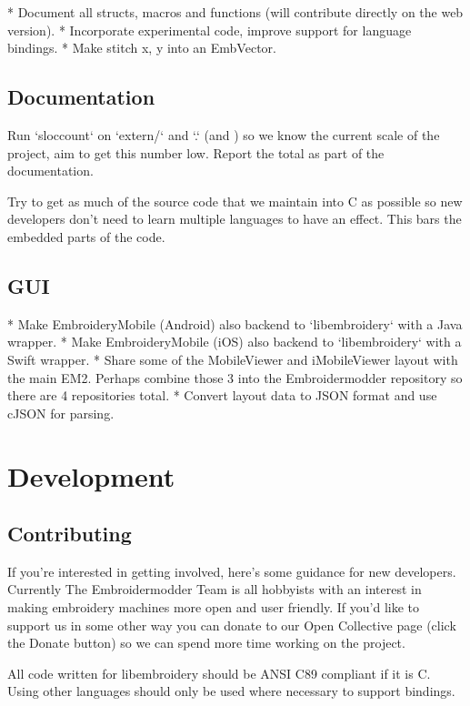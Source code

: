 \documentclass[a4paper]{report}
\begin{document}
* Document all structs, macros and functions (will contribute directly
  on the web version).
* Incorporate experimental code, improve support for language bindings.
* Make stitch x, y into an EmbVector.

\subsection{Documentation}

Run `sloccount` on `extern/` and `.` (and ) so we know the
current scale of the project, aim to get this number low. Report the total as
part of the documentation.

Try to get as much of the source code that we maintain into C as possible so
new developers don't need to learn multiple languages to have an effect. This
bars the embedded parts of the code.

\subsection{GUI}

* Make EmbroideryMobile (Android) also backend to `libembroidery` with a Java wrapper.
* Make EmbroideryMobile (iOS) also backend to `libembroidery` with a Swift wrapper.
* Share some of the MobileViewer and iMobileViewer layout with the main EM2. Perhaps combine those 3 into the Embroidermodder repository so there are 4 repositories total.
* Convert layout data to JSON format and use cJSON for parsing.

\section{Development}

\subsection{Contributing}

If you're interested in getting involved, here's some guidance
for new developers. Currently The Embroidermodder Team is all
hobbyists with an interest in making embroidery machines more
open and user friendly. If you'd like to support us in some other way
you can donate to our Open Collective page (click the Donate button) so
we can spend more time working on the project.

All code written for libembroidery should be ANSI C89 compliant
if it is C. Using other languages should only be used where
necessary to support bindings.
\end{document}
